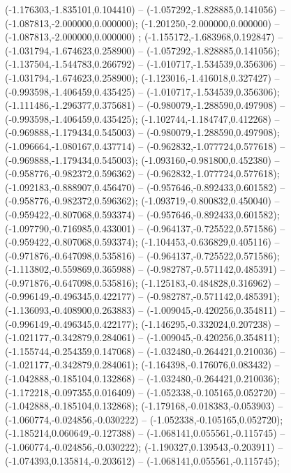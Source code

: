  (-1.176303,-1.835101,0.104410) -- (-1.057292,-1.828885,0.141056) -- (-1.087813,-2.000000,0.000000);
 (-1.201250,-2.000000,0.000000) -- (-1.087813,-2.000000,0.000000) ;
 (-1.155172,-1.683968,0.192847) -- (-1.031794,-1.674623,0.258900) -- (-1.057292,-1.828885,0.141056);
 (-1.137504,-1.544783,0.266792) -- (-1.010717,-1.534539,0.356306) -- (-1.031794,-1.674623,0.258900);
 (-1.123016,-1.416018,0.327427) -- (-0.993598,-1.406459,0.435425) -- (-1.010717,-1.534539,0.356306);
 (-1.111486,-1.296377,0.375681) -- (-0.980079,-1.288590,0.497908) -- (-0.993598,-1.406459,0.435425);
 (-1.102744,-1.184747,0.412268) -- (-0.969888,-1.179434,0.545003) -- (-0.980079,-1.288590,0.497908);
 (-1.096664,-1.080167,0.437714) -- (-0.962832,-1.077724,0.577618) -- (-0.969888,-1.179434,0.545003);
 (-1.093160,-0.981800,0.452380) -- (-0.958776,-0.982372,0.596362) -- (-0.962832,-1.077724,0.577618);
 (-1.092183,-0.888907,0.456470) -- (-0.957646,-0.892433,0.601582) -- (-0.958776,-0.982372,0.596362);
 (-1.093719,-0.800832,0.450040) -- (-0.959422,-0.807068,0.593374) -- (-0.957646,-0.892433,0.601582);
 (-1.097790,-0.716985,0.433001) -- (-0.964137,-0.725522,0.571586) -- (-0.959422,-0.807068,0.593374);
 (-1.104453,-0.636829,0.405116) -- (-0.971876,-0.647098,0.535816) -- (-0.964137,-0.725522,0.571586);
 (-1.113802,-0.559869,0.365988) -- (-0.982787,-0.571142,0.485391) -- (-0.971876,-0.647098,0.535816);
 (-1.125183,-0.484828,0.316962) -- (-0.996149,-0.496345,0.422177) -- (-0.982787,-0.571142,0.485391);
 (-1.136093,-0.408900,0.263883) -- (-1.009045,-0.420256,0.354811) -- (-0.996149,-0.496345,0.422177);
 (-1.146295,-0.332024,0.207238) -- (-1.021177,-0.342879,0.284061) -- (-1.009045,-0.420256,0.354811);
 (-1.155744,-0.254359,0.147068) -- (-1.032480,-0.264421,0.210036) -- (-1.021177,-0.342879,0.284061);
 (-1.164398,-0.176076,0.083432) -- (-1.042888,-0.185104,0.132868) -- (-1.032480,-0.264421,0.210036);
 (-1.172218,-0.097355,0.016409) -- (-1.052338,-0.105165,0.052720) -- (-1.042888,-0.185104,0.132868);
 (-1.179168,-0.018383,-0.053903) -- (-1.060774,-0.024856,-0.030222) -- (-1.052338,-0.105165,0.052720);
 (-1.185214,0.060649,-0.127388) -- (-1.068141,0.055561,-0.115745) -- (-1.060774,-0.024856,-0.030222);
 (-1.190327,0.139543,-0.203911) -- (-1.074393,0.135814,-0.203612) -- (-1.068141,0.055561,-0.115745);
